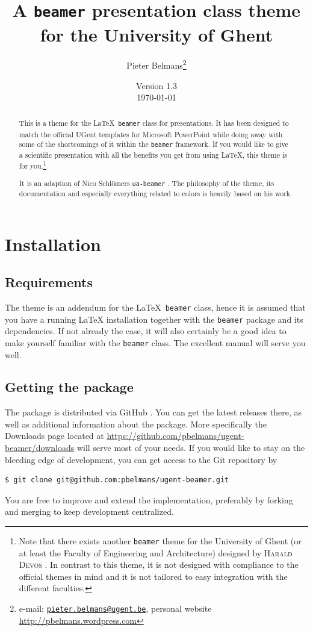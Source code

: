 \documentclass[a4paper,10pt]{article}
\title{A \texttt{beamer} presentation class theme for the University of Ghent}
\author{Pieter Belmans\thanks{e-mail: \href{mailto:pieter.belmans@ugent.be}{\nolinkurl{pieter.belmans@ugent.be}}, personal website \url{http://pbelmans.wordpress.com}}}
\date{Version 1.3 \\ \today}
\theoremstyle{definition}
\begin{document}
\maketitle

\begin{abstract}
  This is a theme for the \LaTeX\ \texttt{beamer} class for presentations. It has been designed to match the official UGent templates for Microsoft PowerPoint\textsuperscript{\textregistered} while doing away with some of the shortcomings of it within the \texttt{beamer} framework. If you would like to give a scientific presentation with all the benefits you get from using \LaTeX, this theme is for you.\footnote{Note that there exists another \texttt{beamer} theme for the University of Ghent (or at least the Faculty of Engineering and Architecture) designed by \textsc{Harald Devos} \cite{devos-theme}. In contrast to this theme, it is not designed with compliance to the official themes in mind and it is not tailored to easy integration with the different faculties.}

  It is an adaption of Nico Schl\"omers \texttt{ua-beamer} \cite{ua-beamer}. The philosophy of the theme, its documentation and especially everything related to colors is heavily based on his work.
\end{abstract}


\section{Installation}

\subsection{Requirements}
  The theme is an addendum for the \LaTeX\ \texttt{beamer} class, hence it is assumed that you have a running \LaTeX{} installation together with the \texttt{beamer} package \cite{beamer-repository} and its dependencies. If not already the case, it will also certainly be a good idea to make yourself familiar with the \texttt{beamer} class. The excellent manual \cite{beamer-manual} will serve you well.

\subsection{Getting the package}

The package is distributed via GitHub \cite{ugent-beamer}. You can get the latest releases there, as well as additional information about the package. More specifically the Downloads page located at \url{https://github.com/pbelmans/ugent-beamer/downloads} will serve most of your needs. If you would like to stay on the bleeding edge of development, you can get access to the Git repository by
\begin{verbatim}
$ git clone git@github.com:pbelmans/ugent-beamer.git
\end{verbatim}
You are free to improve and extend the implementation, preferably by forking and merging to keep development centralized.
\end{document}
